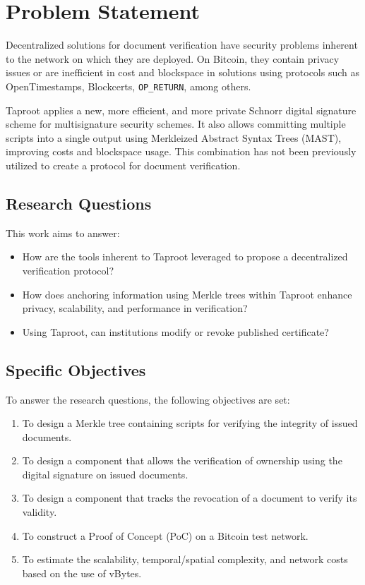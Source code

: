 \section{Problem Statement}

Decentralized solutions for document verification have security problems inherent to the network on which they are deployed.
On Bitcoin, they contain privacy issues or are inefficient in cost and blockspace in solutions using protocols such as OpenTimestamps, Blockcerts, \texttt{OP\_RETURN}, among others.

Taproot applies a new, more efficient, and more private Schnorr digital signature scheme for multisignature security schemes.
It also allows committing multiple scripts into a single output using Merkleized Abstract Syntax Trees (MAST), improving costs and blockspace usage.
This combination has not been previously utilized to create a protocol for document verification.

\subsection{Research Questions}

This work aims to answer:
\begin{itemize}
    \item How are the tools inherent to Taproot leveraged to propose a decentralized verification protocol?
    \item How does anchoring information using Merkle trees within Taproot enhance privacy, scalability, and performance in verification?
    \item Using Taproot, can institutions modify or revoke published certificate?
\end{itemize}

\subsection{Specific Objectives}
To answer the research questions, the following objectives are set:
\begin{enumerate}[label=\alph*)]
    \item To design a Merkle tree containing scripts for verifying the integrity of issued documents.
    \item To design a component that allows the verification of ownership using the digital signature on issued documents.
    \item To design a component that tracks the revocation of a document to verify its validity.
    \item To construct a Proof of Concept (PoC) on a Bitcoin test network.
    \item To estimate the scalability, temporal/spatial complexity, and network costs based on the use of vBytes.
\end{enumerate}